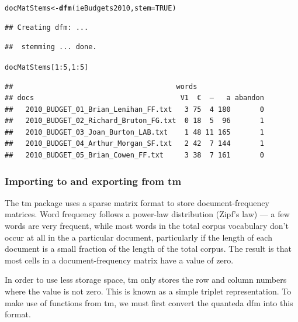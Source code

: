 \documentclass[11pt]{article}\usepackage[]{graphicx}\usepackage[]{color}
\makeatletter
\newcommand{\hlnum}[1]{\textcolor[rgb]{0.686,0.059,0.569}{#1}}%
\newcommand{\hlopt}[1]{\textcolor[rgb]{0,0,0}{#1}}%
\newcommand{\hlstd}[1]{\textcolor[rgb]{0.345,0.345,0.345}{#1}}%
\newcommand{\hlkwb}[1]{\textcolor[rgb]{0.69,0.353,0.396}{#1}}%
\newcommand{\hlkwc}[1]{\textcolor[rgb]{0.333,0.667,0.333}{#1}}%
\newcommand{\hlkwd}[1]{\textcolor[rgb]{0.737,0.353,0.396}{\textbf{#1}}}%
\newenvironment{kframe}{%
 \def\at@end@of@kframe{}%
 \ifinner\ifhmode%
  \def\at@end@of@kframe{\end{minipage}}%
  \begin{minipage}{\columnwidth}%
 \fi\fi%
 \def\FrameCommand##1{\hskip\@totalleftmargin \hskip-\fboxsep
 \colorbox{shadecolor}{##1}\hskip-\fboxsep
     \hskip-\linewidth \hskip-\@totalleftmargin \hskip\columnwidth}%
 \MakeFramed {\advance\hsize-\width
   \@totalleftmargin\z@ \linewidth\hsize
   \@setminipage}}%
 {\par\unskip\endMakeFramed%
 \at@end@of@kframe}
\newenvironment{knitrout}{}{} %
\makeatother
\begin{document}
\begin{knitrout}\footnotesize
{}\color{fgcolor}\begin{kframe}
\begin{alltt}
\hlstd{docMatStems} \hlkwb{<-} \hlkwd{dfm}\hlstd{(ieBudgets2010,} \hlkwc{stem}\hlstd{=}\hlnum{TRUE}\hlstd{)}
\end{alltt}
\begin{verbatim}
## Creating dfm: ...
\end{verbatim}


{\ttfamily\noindent\itshape\color{messagecolor}{\#\# Loading required package: SnowballC}}\begin{verbatim}
##  stemming ... done.
\end{verbatim}
\begin{alltt}
\hlstd{docMatStems[}\hlnum{1}\hlopt{:}\hlnum{5}\hlstd{,}\hlnum{1}\hlopt{:}\hlnum{5}\hlstd{]}
\end{alltt}
\begin{verbatim}
##                                       words
## docs                                   V1  €  —   a abandon
##   2010_BUDGET_01_Brian_Lenihan_FF.txt   3 75  4 180       0
##   2010_BUDGET_02_Richard_Bruton_FG.txt  0 18  5  96       1
##   2010_BUDGET_03_Joan_Burton_LAB.txt    1 48 11 165       1
##   2010_BUDGET_04_Arthur_Morgan_SF.txt   2 42  7 144       1
##   2010_BUDGET_05_Brian_Cowen_FF.txt     3 38  7 161       0
\end{verbatim}
\end{kframe}
\end{knitrout}

\subsubsection{Importing to and exporting from \textsf{tm}}

The \textsf{tm} package uses a sparse matrix format to store document-frequency matrices. Word frequency follows a power-law distribution (Zipf's law) --- a few words are very frequent, while most words in the total corpus vocabulary don't occur at all in the a particular document, particularly if the length of each document is a small fraction of the length of the total corpus.  The result is that most cells in a document-frequency matrix have a value of zero. 

In order to use less storage space, \textsf{tm} only stores the row and column numbers where the value is not zero. This is known as a simple triplet representation. To make use of functions from \textsf{tm}, we must first convert the quanteda dfm into this format. 
\end{document}
